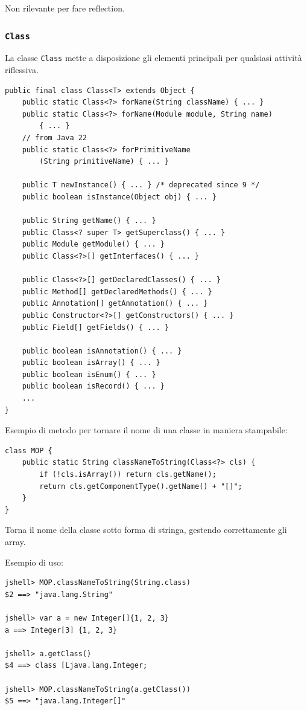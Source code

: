 Non rilevante per fare reflection.

\subsubsection{\texttt{Class}}
La classe \texttt{Class} mette a disposizione gli elementi principali per qualsiasi attività riflessiva.
\begin{verbatim}
public final class Class<T> extends Object {
    public static Class<?> forName(String className) { ... }
    public static Class<?> forName(Module module, String name)
        { ... }
    // from Java 22
    public static Class<?> forPrimitiveName
        (String primitiveName) { ... }

    public T newInstance() { ... } /* deprecated since 9 */
    public boolean isInstance(Object obj) { ... }

    public String getName() { ... }
    public Class<? super T> getSuperclass() { ... }
    public Module getModule() { ... }
    public Class<?>[] getInterfaces() { ... }

    public Class<?>[] getDeclaredClasses() { ... }
    public Method[] getDeclaredMethods() { ... }
    public Annotation[] getAnnotation() { ... }
    public Constructor<?>[] getConstructors() { ... }
    public Field[] getFields() { ... }

    public boolean isAnnotation() { ... }
    public boolean isArray() { ... }
    public boolean isEnum() { ... }
    public boolean isRecord() { ... }
    ...
}
\end{verbatim}

\newpage

Esempio di metodo per tornare il nome di una classe in maniera stampabile:
\begin{verbatim}
class MOP {
    public static String classNameToString(Class<?> cls) {
        if (!cls.isArray()) return cls.getName();
        return cls.getComponentType().getName() + "[]";
    }
}
\end{verbatim}
Torna il nome della classe sotto forma di stringa, gestendo correttamente gli array.

Esempio di uso:
\begin{verbatim}
jshell> MOP.classNameToString(String.class)
$2 ==> "java.lang.String"

jshell> var a = new Integer[]{1, 2, 3}
a ==> Integer[3] {1, 2, 3}

jshell> a.getClass()
$4 ==> class [Ljava.lang.Integer;

jshell> MOP.classNameToString(a.getClass())
$5 ==> "java.lang.Integer[]"
\end{verbatim}

